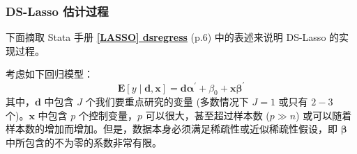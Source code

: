 %


\subsubsection{DS-Lasso 估计过程}
下面摘取 Stata 手册 \href{https://www.stata.com/manuals/lassodsregress.pdf}{\bfseries{[\MakeUppercase{lasso}] dsregress}} (p.6) 中的表述来说明 DS-Lasso 的实现过程。

考虑如下回归模型：
\begin{equation}\label{eq:Lasso-DS-01}
	\mathbf{E}[y \mid \mathbf{d}, \mathbf{x}]=\mathbf{d} \boldsymbol{\alpha}^{\prime}+\beta_{0}+\mathbf{x} \boldsymbol{\beta}^{\prime}
\end{equation}
其中，$\mathbf{d}$ 中包含 $J$ 个我们要重点研究的变量 (多数情况下 $J=1$ 或只有 $2-3$ 个)。$\mathbf{x}$ 中包含 $p$ 个控制变量，$p$ 可以很大，甚至超过样本数 ($p\gg n$) 或可以随着样本数的增加而增加。但是，数据本身必须满足稀疏性或近似稀疏性假设，即 $\boldsymbol{\beta}$ 中所包含的不为零的系数非常有限。

